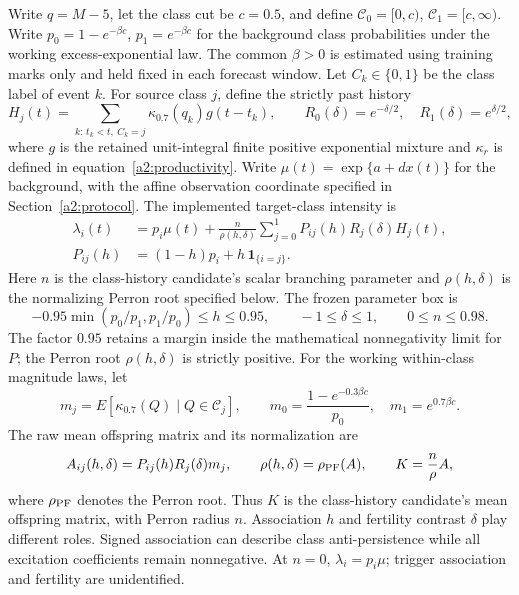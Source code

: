 Write \(q=M-5\), let the class cut be \(c=0.5\), and define
\(\mathcal C_0=[0,c)\), \(\mathcal C_1=[c,\infty)\). Write
\(p_0=1-e^{-\beta c}\), \(p_1=e^{-\beta c}\) for the background class
probabilities under the working excess-exponential law. The common
\(\beta>0\) is estimated using training marks only and held fixed in each
forecast window. Let \(C_k\in\{0,1\}\) be the class label of event \(k\).
For source class \(j\), define the strictly past history
\[
 H_j(t)=\sum_{k:\,t_k<t,\ C_k=j}\kappa_{0.7}(q_k)g(t-t_k),
 \qquad
 R_0(\delta)=e^{-\delta/2},\quad R_1(\delta)=e^{\delta/2},
\]
where \(g\) is the retained unit-integral finite positive exponential
mixture and \(\kappa_r\) is defined in equation~\eqref{a2:productivity}.
Write \(\mu(t)=\exp\{a+d x(t)\}\) for the background, with the affine
observation coordinate specified in Section~\ref{a2:protocol}.
The implemented target-class intensity is
\begin{equation}
 \begin{aligned}
 \lambda_i(t)&=p_i\mu(t)+\frac{n}{\rho(h,\delta)}
       \sum_{j=0}^1 P_{ij}(h)R_j(\delta)H_j(t),\\
 P_{ij}(h)&=(1-h)p_i+h\,\mathbf 1_{\{i=j\}}.
 \end{aligned}
 \label{a2:class-intensity}
\end{equation}
Here \(n\) is the class-history candidate's scalar branching parameter and
\(\rho(h,\delta)\) is the normalizing Perron root specified below.
The frozen parameter box is
\[
 -0.95\min(p_0/p_1,p_1/p_0)\leq h\leq0.95,\qquad
 -1\leq\delta\leq1,\qquad 0\leq n\leq0.98.
\]
The factor \(0.95\) retains a margin inside the mathematical
nonnegativity limit for \(P\); the Perron root \(\rho(h,\delta)\) is
strictly positive.
For the working within-class magnitude laws, let
\[
 m_j=E[\kappa_{0.7}(Q)\mid Q\in\mathcal C_j],\qquad
 m_0=\frac{1-e^{-0.3\beta c}}{p_0},\quad m_1=e^{0.7\beta c}.
\]
The raw mean offspring matrix and its normalization are
\[
 A_{ij}(h,\delta)=P_{ij}(h)R_j(\delta)m_j,\qquad
 \rho(h,\delta)=\rho_{\rm PF}(A),\qquad K=\frac{n}{\rho}A,
\]
where \(\rho_{\rm PF}\) denotes the Perron root. Thus \(K\) is the
class-history candidate's mean offspring matrix, with Perron radius \(n\).
Association \(h\) and fertility contrast \(\delta\) play different roles.
Signed association can describe class anti-persistence while all
excitation coefficients remain nonnegative. At \(n=0\),
\(\lambda_i=p_i\mu\); trigger association and fertility are unidentified.

